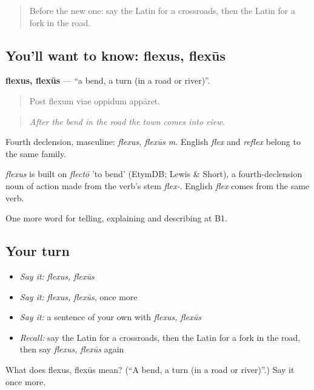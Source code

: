 \begin{quote}
Before the new one: say the Latin for a crossroads, then the Latin for a fork in the road.
\end{quote}

\subsection*{You'll want to know: flexus, flexūs}
\textbf{flexus, flexūs} — \textquotedblleft{}a bend, a turn (in a road or river)\textquotedblright{}.

\begin{quote}
Post flexum viae oppidum appāret.
\end{quote}

\begin{quote}
\emph{After the bend in the road the town comes into view.}
\end{quote}

Fourth declension, masculine: \emph{flexus, flexūs m.} English \emph{flex} and \emph{reflex} belong to the same family.

\begin{cousinweb}
\emph{flexus} is built on \emph{flectō} 'to bend' (EtymDB; Lewis \& Short), a fourth-declension noun of action made from the verb's stem \emph{flex-}. English \emph{flex} comes from the same verb.
\end{cousinweb}

\begin{grammarlens}[title={What you've built}]
One more word for telling, explaining and describing at B1.
\end{grammarlens}

\subsection*{Your turn}
\begin{itemize}
\raggedright
  \item \emph{Say it:} \emph{flexus, flexūs}
  \item \emph{Say it:} \emph{flexus, flexūs}, once more
  \item \emph{Say it:} a sentence of your own with \emph{flexus, flexūs}
  \item \emph{Recall:} say the Latin for a crossroads, then the Latin for a fork in the road, then say \emph{flexus, flexūs} again
\end{itemize}

\begin{tcolorbox}[breakable,colback=teal!4,colframe=teal!35!black,title={Before you move on}]
What does flexus, flexūs mean? (\textquotedblleft{}A bend, a turn (in a road or river)\textquotedblright{}.) Say it once more.
\end{tcolorbox}
